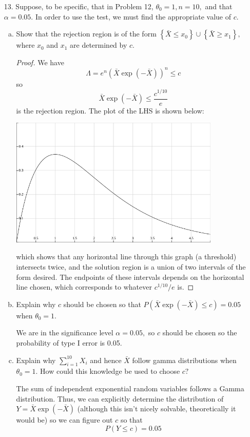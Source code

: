 \documentclass{article}
\begin{document}
\begin{itemize}
	\item[13.] Suppose, to be specific, that in Problem 12, $\theta_0=1, n=10,$ and that $\alpha=0.05.$ In order to use the test, we must find the appropriate value of $c.$
		\begin{enumerate}[a.]
			\item Show that the rejection region is of the form $\left\{ \bar{X}\le x_0 \right\}\cup \left\{ \bar{X}\ge x_1 \right\},$ where $x_0$ and $x_1$ are determined by $c.$
				\begin{proof}
					We have \[\Lambda=e^n (\bar{X}\exp(-\bar{X}))^n\le c\] so \[\bar{X}\exp(-\bar{X})\le \frac{c^{1/10}}{e}\] is the rejection region. The plot of the LHS is shown below:
					\begin{center}
						\includegraphics[width=10cm]{save.png}
					\end{center}
					which shows that any horizontal line through this graph (a threshold) intersects twice, and the solution region is a union of two intervals of the form desired. The endpoints of these intervals depends on the horizontal line chosen, which corresponds to whatever $c^{1/10}/e$ is.

				\end{proof}

			\item Explain why $c$ should be chosen so that $P(\bar{X}\exp(-\bar{X})\le c)=0.05$ when $\theta_0=1.$
				\begin{answer*}
					We are in the significance level $\alpha=0.05,$ so $c$ should be chosen so the probability of type I error is 0.05.
				\end{answer*}

			\item Explain why $\displaystyle \sum_{i=1}^{10} X_i$ and hence $\bar{X}$ follow gamma distributions when $\theta_0=1.$ How could this knowledge be used to choose $c?$
				\begin{answer*}
					The sum of independent exponential random variables follows a Gamma distribution. Thus, we can explicitly determine the distribution of $Y=\bar{X} \exp(-\bar{X})$ (although this isn't nicely solvable, theoretically it would be) so we can figure out $c$ so that \[P(Y\le c)=0.05\]
				\end{answer*}


\end{enumerate}
\end{itemize}
\end{document}
